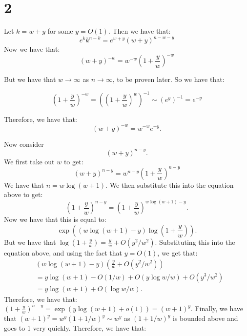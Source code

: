 \documentclass[]{article}
\begin{document}
\section{2}
Let $k = w + y$ for some $y = O(1)$. Then we have that:
\begin{equation}
	e^{k} k^{n - k} = e^{w + y} (w + y)^{n - w - y}
\end{equation}
Now we have that:
\begin{equation}
	(w + y)^{-w} = w^{-w} \left(1 + \frac{y}{w}\right)^{-w}
\end{equation}

But we have that $w \rightarrow \infty$ as $n \rightarrow \infty$, to be proven later. So we have that: 

\begin{equation}
	\left(1 + \frac{y}{w}\right)^{-w} = \left(\left(1 + \frac{y}{w}\right)^{w}\right)^{-1} \sim \left(e^{y}\right)^{-1} = e^{-y}
\end{equation}

Therefore, we have that:
\begin{equation}
	(w + y)^{-w} = w^{-w} e^{-y}.
\end{equation}

Now consider
\begin{equation}
	(w + y)^{n - y}.
\end{equation}
We first take out $w$ to get:
\begin{equation}
	(w + y)^{n - y} = w^{n - y} \left(1 + \frac{y}{w}\right)^{n - y}
\end{equation}
We have that $n = w \log (w + 1)$. We then substitute this into the equation above to get:
\begin{equation}
	\left(1 + \frac{y}{w}\right)^{n - y} = \left(1 + \frac{y}{w}\right)^{w \log(w + 1) - y}.
\end{equation}
Now we have that this is equal to:
\begin{equation}
	\exp((w \log(w + 1) - y) \log\left(1 + \frac{y}{w}\right)).
\end{equation}
But we have that $\log\left(1 + \frac{y}{w}\right) = \frac{y}{w} + O(y^2/w^2)$. Substituting this into the equation above, and using the fact that $y = O(1)$, we get that:
\begin{align*}
	&(w \log(w + 1) - y)(\frac{y}{w} + O(y^2/w^2))\\ 
	&= y \log(w + 1) - O(1/w) + O(y \log w/w) + O(y^3/w^2)\\ 
	&=  y \log(w + 1) + O(\log w / w).
\end{align*}
Therefore, we have that:
$\left(1 + \frac{y}{w}\right)^{n - y} = \exp(y \log(w + 1) + o(1)) = (w + 1)^y$. 
Finally, we have that $(w + 1)^y = w^y (1 + 1/w)^y \sim w^y$ as $(1 + 1/w)^y$ is bounded above and goes to 1 very quickly. 
Therefore, we have that:
\end{document}
